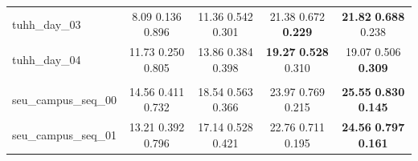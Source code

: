 \documentclass[lettersize,journal]{IEEEtran}
\begin{document}
\begin{table}[!t]
{\begin{tabular}{lcccc}
tuhh\_day\_03 & 8.09 \textbar{} 0.136 \textbar{} 0.896 & 11.36 \textbar{} 0.542 \textbar{} 0.301 & 21.38 \textbar{} 0.672 \textbar{} \textbf{0.229} & \textbf{21.82} \textbar{} \textbf{0.688} \textbar{} 0.238 \\
tuhh\_day\_04 & 11.73 \textbar{} 0.250 \textbar{} 0.805 & 13.86 \textbar{} 0.384 \textbar{} 0.398 & \textbf{19.27} \textbar{} \textbf{0.528} \textbar{} 0.310 & 19.07 \textbar{} 0.506 \textbar{} \textbf{0.309} \\
\rowcolor{black!8}
\multicolumn{5}{l}{\textbf{Self-Collected Campus Dataset}} \\
seu\_campus\_seq\_00 & 14.56 \textbar{} 0.411 \textbar{} 0.732 & 18.54 \textbar{} 0.563 \textbar{} 0.366 & 23.97 \textbar{} 0.769 \textbar{} 0.215 & \textbf{25.55} \textbar{} \textbf{0.830} \textbar{} \textbf{0.145} \\
seu\_campus\_seq\_01 & 13.21 \textbar{} 0.392 \textbar{} 0.796 & 17.14 \textbar{} 0.528 \textbar{} 0.421 & 22.76 \textbar{} 0.711 \textbar{} 0.195 & \textbf{24.56} \textbar{} \textbf{0.797} \textbar{} \textbf{0.161} \\
\bottomrule
\end{tabular}%
}
\end{table}
\end{document}
